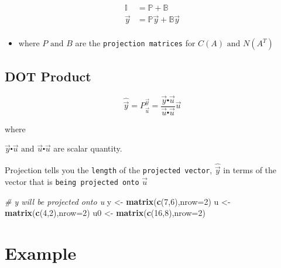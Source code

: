 \documentclass[
]{article}
\newenvironment{Shaded}{\begin{snugshade}}{\end{snugshade}}
\newcommand{\AttributeTok}[1]{\textcolor[rgb]{0.13,0.29,0.53}{#1}}
\newcommand{\CommentTok}[1]{\textcolor[rgb]{0.56,0.35,0.01}{\textit{#1}}}
\newcommand{\DecValTok}[1]{\textcolor[rgb]{0.00,0.00,0.81}{#1}}
\newcommand{\FunctionTok}[1]{\textcolor[rgb]{0.13,0.29,0.53}{\textbf{#1}}}
\newcommand{\NormalTok}[1]{#1}
\newcommand{\OtherTok}[1]{\textcolor[rgb]{0.56,0.35,0.01}{#1}}
\providecommand{\tightlist}{%
  \setlength{\itemsep}{0pt}\setlength{\parskip}{0pt}}
\begin{document}
\[\begin{aligned}
 \mathbb{I}  &= \mathbb{P} + \mathbb{B} \\
\vec{y} &= \mathbb{P}\vec{y} + \mathbb{B}\vec{y}\\
\end{aligned}\]

\begin{itemize}
\tightlist
\item
  where \(P \text{ and } B\) are the \texttt{projection\ matrices} for
  \(C(A) \text{ and } N(A^T)\)
\end{itemize}

\hypertarget{dot-product}{%
\subsection{DOT Product}\label{dot-product}}

\[\hat{\vec{y}} = P_{\vec{u}}^{\vec{y}} = \frac{\vec{y}\centerdot\vec{u}}{\vec{u}\centerdot\vec{u}}\vec{u}\]

where

\(\vec{y}\centerdot\vec{u} \text{ and } \vec{u}\centerdot\vec{u}\) are
scalar quantity.

Projection tells you the \texttt{length} of the
\texttt{projected\ vector}, \(\hat{\vec{y}}\) in terms of the vector
that is \texttt{being\ projected\ onto} \(\vec{u}\)

\begin{Shaded}
\begin{Highlighting}[]
\CommentTok{\# y will be projected onto u}
\NormalTok{y }\OtherTok{\textless{}{-}} \FunctionTok{matrix}\NormalTok{(}\FunctionTok{c}\NormalTok{(}\DecValTok{7}\NormalTok{,}\DecValTok{6}\NormalTok{),}\AttributeTok{nrow=}\DecValTok{2}\NormalTok{)}
\NormalTok{u }\OtherTok{\textless{}{-}} \FunctionTok{matrix}\NormalTok{(}\FunctionTok{c}\NormalTok{(}\DecValTok{4}\NormalTok{,}\DecValTok{2}\NormalTok{),}\AttributeTok{nrow=}\DecValTok{2}\NormalTok{)}
\NormalTok{u0 }\OtherTok{\textless{}{-}} \FunctionTok{matrix}\NormalTok{(}\FunctionTok{c}\NormalTok{(}\DecValTok{16}\NormalTok{,}\DecValTok{8}\NormalTok{),}\AttributeTok{nrow=}\DecValTok{2}\NormalTok{)}
\end{Highlighting}
\end{Shaded}

\hypertarget{example-1}{%
\section{Example}\label{example-1}}
\end{document}

